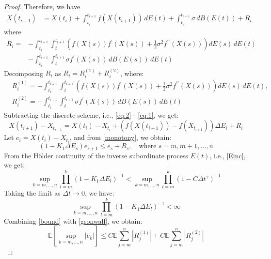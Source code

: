 \documentclass[10pt,reqno,final]{amsart}
\theoremstyle{plain}
\theoremstyle{definition}
\theoremstyle{remark}
\numberwithin{equation}{section}
\numberwithin{figure}{section}
\numberwithin{table}{section}
\begin{document}
\begin{proof}
	Therefore, we have
	\begin{align}\label{eq:2}
		X(t_{i+1})
		&= X(t_i) + \int_{t_i}^{t_{i+1}} f(X(t_{i+1})) \, dE(t) + \int_{t_i}^{t_{i+1}} \sigma \, dB(E(t)) + R_i
	\end{align}
	where
	\begin{align*}
		R_i = & -\int_{t_i}^{t_{i+1}} \int_{t}^{t_{i+1}} \left( f(X(s)) f^{\prime}(X(s)) + \frac{1}{2} \sigma^2 f^{\prime\prime}(X(s)) \right) dE(s) \, dE(t) \\
		& - \int_{t_i}^{t_{i+1}} \int_{t}^{t_{i+1}} \sigma f^{\prime}(X(s)) \, dB(E(s)) \, dE(t)
	\end{align*}
	Decomposing \(R_i\) as \(R_i = R_i^{(1)} + R_i^{(2)}\), where:
	\begin{align*}
		& R_i^{(1)} = -\int_{t_i}^{t_{i+1}} \int_{t}^{t_{i+1}} \left( f(X(s)) f^{\prime}(X(s)) + \frac{1}{2} \sigma^2 f^{\prime\prime}(X(s)) \right) dE(s) \, dE(t), \\
		& R_i^{(2)} = -\int_{t_i}^{t_{i+1}} \int_{t}^{t_{i+1}} \sigma f^{\prime}(X(s)) \, dB(E(s)) \, dE(t)
	\end{align*}
	Subtracting the discrete scheme, i.e., \cref{eq:2} - \cref{eq:1}, we get:
	\begin{equation}
		X(t_{i+1}) - X_{t_{i+1}} = X(t_i) - X_{t_i} + (f(X(t_{i+1})) - f(X_{t_{i+1}})) \Delta E_i + R_i
	\end{equation}
	Let \(e_i = X(t_i) - X_{t_i}\), and from \cref{monotony}, we obtain:
	\begin{equation}
		(1 - K_1 \Delta E_s) e_{s+1} \leq e_s + R_s, \quad \text{where } s = m, m+1, \ldots, n
	\end{equation}
	From the Hölder continuity of the inverse subordinate process \(E(t)\), i.e., \cref{Einc}, we get:
	\begin{equation}\label{bound}
		\sup_{k=m,\ldots,n} \prod_{l=m}^{k} (1 - K_1 \Delta E_l)^{-1} < \sup_{k=m,\ldots,n} \prod_{l=m}^{k} (1 - C \Delta t^\gamma)^{-1}
	\end{equation}
	Taking the limit as \(\Delta t \to 0\), we have:
	\[
	\sup_{k=m,\ldots,n} \prod_{l=m}^{k} (1 - K_1 \Delta E_l)^{-1} < \infty
	\]
	Combining \cref{bound} with \cref{gronwall}, we obtain:
	$$
	\mathbb{E} \left[\sup_{k=m,\ldots,n} |e_k|\right] \leq C \mathbb{E} \sum_{j=m}^{n} |R_j^{(1)}| + C \mathbb{E} \sum_{j=m}^{n} |R_j^{(2)}|
	$$
	

\end{proof}
\end{document}
